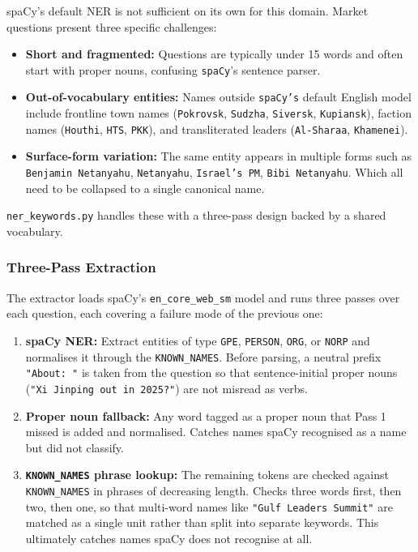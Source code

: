 \documentclass[11pt]{article}
\begin{document}
\noindent spaCy's default NER is not sufficient on its own for this
domain. Market questions present three specific challenges:

\begin{itemize}
    \item \textbf{Short and fragmented:} Questions are typically
          under 15 words and often start with proper nouns,
          confusing \texttt{spaCy}'s sentence parser.
    \item \textbf{Out-of-vocabulary entities:} Names outside \texttt{spaCy's}
          default English model include frontline town names
          (\texttt{Pokrovsk}, \texttt{Sudzha}, \texttt{Siversk},
          \texttt{Kupiansk}), faction names (\texttt{Houthi},
          \texttt{HTS}, \texttt{PKK}), and transliterated leaders
          (\texttt{Al-Sharaa}, \texttt{Khamenei}).
    \item \textbf{Surface-form variation:} The same entity appears
          in multiple forms such as \texttt{Benjamin Netanyahu},
          \texttt{Netanyahu}, \texttt{Israel's PM}, \texttt{Bibi Netanyahu}. Which all need to be collapsed to a single canonical name.
\end{itemize}

\noindent \texttt{ner\_keywords.py} handles these with a three-pass
design backed by a shared vocabulary.

\subsubsection*{Three-Pass Extraction}

The extractor loads spaCy's \texttt{en\_core\_web\_sm} model and
runs three passes over each question, each covering a failure mode
of the previous one:

\begin{enumerate}
    \item \textbf{spaCy NER:} Extract entities of type \texttt{GPE},
          \texttt{PERSON}, \texttt{ORG}, or \texttt{NORP} and
          normalises it through the \texttt{KNOWN\_NAMES}. Before parsing, a
          neutral prefix \texttt{"About: "} is taken from the
          question so that sentence-initial proper nouns
          (\texttt{"Xi Jinping out in 2025?"}) are not misread as
          verbs.
    \item \textbf{Proper noun fallback:} Any word tagged as a proper
      noun that Pass 1 missed is added and normalised. Catches
      names spaCy recognised as a name but did not classify.

    \item \textbf{\texttt{KNOWN\_NAMES} phrase lookup:} The remaining
        tokens are checked against \texttt{KNOWN\_NAMES} in phrases
        of decreasing length. Checks three words first, then two, then one, so that multi-word names like \texttt{"Gulf Leaders Summit"}
        are matched as a single unit rather than split into separate
        keywords. This ultimately catches names spaCy does not recognise at all.
\end{enumerate}
\end{document}
